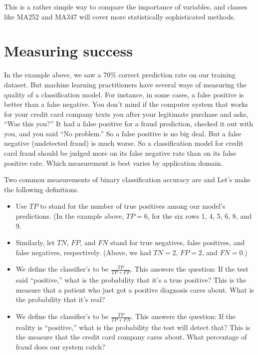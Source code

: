 \documentclass[letterpaper,10pt,english]{jupyterBook}
\begin{document}
\sphinxAtStartPar
This is a rather simple way to compare the importance of variables, and classes like MA252 and MA347 will cover more statistically sophisticated methods.


\section{Measuring success}
\label{\detokenize{chapter-17-machine-learning:measuring-success}}
\sphinxAtStartPar
In the example above, we saw a 70\% correct prediction rate on our training dataset.  But machine learning practitioners have several ways of measuring the quality of a classification model.  For instance, in some cases, a false positive is better than a false negative.  You don’t mind if the computer system that works for your credit card company texts you after your legitimate purchase and asks, “Was this you?”  It had a false positive for a fraud prediction, checked it out with you, and you said “No problem.”  So a false positive is no big deal.  But a false negative (undetected fraud) is much worse.  So a classification model for credit card fraud should be judged more on its false negative rate than on its false positive rate.  Which measurement is best varies by application domain.

\sphinxAtStartPar
Two common measurements of binary classification accuracy are  and   Let’s make the following definitions.
\begin{itemize}
\item {} 
\sphinxAtStartPar
Use \(TP\) to stand for the number of true positives among our model’s predictions.  (In the example above, \(TP=6\), for the six rows 1, 4, 5, 6, 8, and 9.

\item {} 
\sphinxAtStartPar
Similarly, let \(TN\), \(FP\), and \(FN\) stand for true negatives, false positives, and false negatives, respectively.  (Above, we had \(TN=2\), \(FP=2\), and \(FN=0\).)

\item {} 
\sphinxAtStartPar
We define the classifier’s  to be \(\frac{TP}{TP+FP}\).  This answers the question:  If the test said “positive,” what is the probability that it’s a true positive?  This is the measure that a patient who just got a positive diagnosis cares about.  What is the probability that it’s real?

\item {} 
\sphinxAtStartPar
We define the classifier’s  to be \(\frac{TP}{TP+FN}\).  This answers the question:  If the reality is “positive,” what is the probability the test will detect that?  This is the measure that the credit card company cares about.  What percentage of fraud does our system catch?

\end{itemize}
\end{document}
